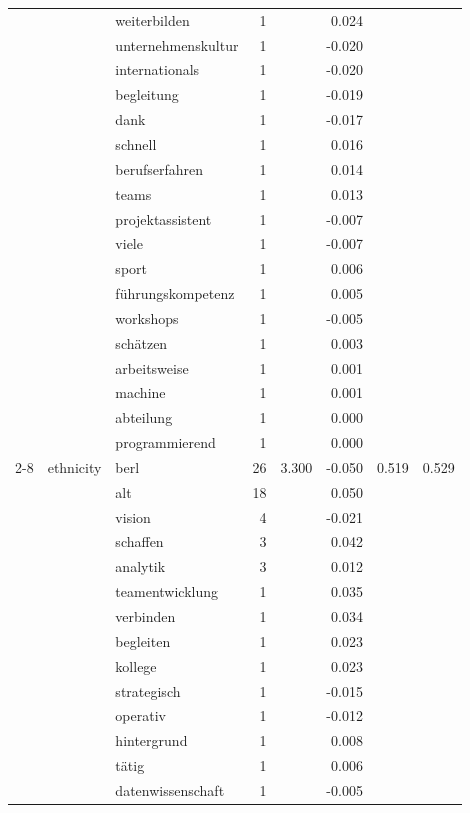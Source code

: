 \begin{longtable}{lllrrr@{\hspace{1em}}r@{\hspace{1em}}r}
 &  & weiterbilden & 1 &  & 0.024 &  &  \\
 &  & unternehmenskultur & 1 &  & -0.020 &  &  \\
 &  & internationals & 1 &  & -0.020 &  &  \\
 &  & begleitung & 1 &  & -0.019 &  &  \\
 &  & dank & 1 &  & -0.017 &  &  \\
 &  & schnell & 1 &  & 0.016 &  &  \\
 &  & berufserfahren & 1 &  & 0.014 &  &  \\
 &  & teams & 1 &  & 0.013 &  &  \\
 &  & projektassistent & 1 &  & -0.007 &  &  \\
 &  & viele & 1 &  & -0.007 &  &  \\
 &  & sport & 1 &  & 0.006 &  &  \\
 &  & führungskompetenz & 1 &  & 0.005 &  &  \\
 &  & workshops & 1 &  & -0.005 &  &  \\
 &  & schätzen & 1 &  & 0.003 &  &  \\
 &  & arbeitsweise & 1 &  & 0.001 &  &  \\
 &  & machine & 1 &  & 0.001 &  &  \\
 &  & abteilung & 1 &  & 0.000 &  &  \\
 &  & programmierend & 1 &  & 0.000 &  &  \\
\cmidrule(lr){2-8}
 & ethnicity & berl & 26 & 3.300 & -0.050 & 0.519 & 0.529 \\
 &  & alt & 18 &  & 0.050 &  &  \\
 &  & vision & 4 &  & -0.021 &  &  \\
 &  & schaffen & 3 &  & 0.042 &  &  \\
 &  & analytik & 3 &  & 0.012 &  &  \\
 &  & teamentwicklung & 1 &  & 0.035 &  &  \\
 &  & verbinden & 1 &  & 0.034 &  &  \\
 &  & begleiten & 1 &  & 0.023 &  &  \\
 &  & kollege & 1 &  & 0.023 &  &  \\
 &  & strategisch & 1 &  & -0.015 &  &  \\
 &  & operativ & 1 &  & -0.012 &  &  \\
 &  & hintergrund & 1 &  & 0.008 &  &  \\
 &  & tätig & 1 &  & 0.006 &  &  \\
 &  & datenwissenschaft & 1 &  & -0.005 &  &  \\

\end{longtable}
